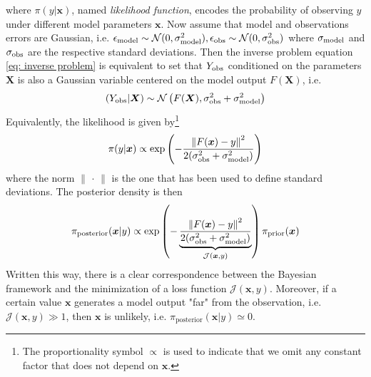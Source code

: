 \documentclass[draft]{agujournal2019}
\newcommand{\parenthese}[1]{\ensuremath{\left(#1\right)}} %
\newcommand{\norm}[1]{\left\lVert #1 \right\rVert} %
\begin{document}
where $\pi(y|\bm x)$, named \textit{likelihood function}, encodes the probability of observing $y$ under different model parameters $\bm x$.
Now assume that model and observations errors are Gaussian, i.e. $\epsilon_{\rm model} \sim \mathcal{N}(0,\sigma_{\rm model}^2), \epsilon_{\rm obs} \sim \mathcal{N}(0,\sigma_{\rm obs}^2)$ where $\sigma_{\rm model}$ and $\sigma_{\rm obs}$ are the respective standard deviations. Then the inverse problem equation \eqref{eq: inverse problem} is equivalent to set that $Y_{\rm obs}$ conditioned on the parameters $\bm X$ is also a Gaussian variable centered on the model output $F(\bm X)$, i.e.
%
\begin{eqnarray*}
    (Y_{\rm obs} | \bm X) \sim \mathcal{N}\parenthese{F(\bm X), \sigma_{\rm obs}^2 + \sigma_{\rm model}^2}
\end{eqnarray*} 
%
Equivalently, the likelihood is given by\footnote{The proportionality symbol $\propto$ is used to indicate that we omit any constant factor that does not depend on $\bm x$.}
%
\begin{eqnarray*}
    \pi(y|\bm x) \propto \exp\parenthese{-\frac{\norm{F(\bm x) - y}^2}{2(\sigma_{\rm obs}^2 + \sigma_{\rm model}^2)}}  
\end{eqnarray*}
%
where the norm $\|\, \cdot \, \|$ is the one that has been used to define standard deviations. The posterior density is then 
%
\begin{eqnarray}\label{eq: posterior}
    \pi_{\text{posterior}}(\bm x | y) \propto \exp\parenthese{-\underbrace{\frac{\norm{F(\bm x) - y}^2}{2(\sigma_{\rm obs}^2 + \sigma_{\rm model}^2)}}_{\mathcal{J}(\bm x,y)}} \pi_{\text{prior}}(\bm x)
\end{eqnarray} 
%
Written this way, there is a clear correspondence between the Bayesian framework and the minimization of a loss function $\mathcal{J}(\bm x, y)$.
%
%
Moreover, if a certain value $\bm x$ generates a model output "far" from the observation, i.e. $\mathcal{J}(\bm x,y) \gg 1$, then $\bm x$ is unlikely, i.e. $\pi_{\text{posterior}}(\bm x | y) \simeq 0$.
%
\end{document}
